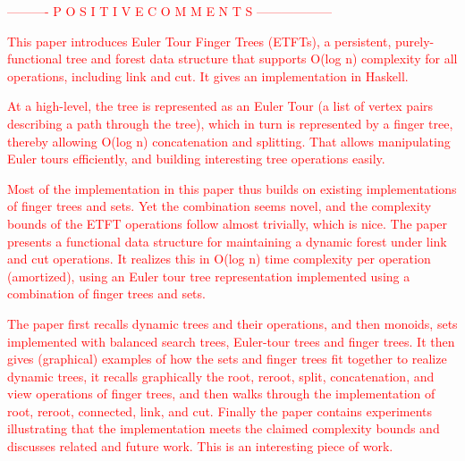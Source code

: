 \documentclass[runningheads,a4paper]{llncs}
\newcommand{\tcr} [1]{\textcolor{red}{#1}}
\begin{document}



\tcr{---------- P O S I T I V E    C O M M E N T S ------------------}


\tcr{This paper introduces Euler Tour Finger Trees (ETFTs), a persistent, purely-functional tree and forest data structure that supports O(log n) complexity for all operations, including link and cut. It gives an implementation in Haskell.}

\tcr{At a high-level, the tree is represented as an Euler Tour (a list of vertex pairs describing a path through the tree), which in turn is represented by a finger tree, thereby allowing O(log n) concatenation and splitting. That allows manipulating Euler tours efficiently, and building interesting tree operations easily.}

\tcr{Most of the implementation in this paper thus builds on existing implementations of finger trees and sets. Yet the combination seems novel, and the complexity bounds of the ETFT operations follow almost trivially, which is nice.
The paper presents a functional data structure for maintaining a dynamic forest under link and cut operations. It realizes this in O(log n) time complexity per operation (amortized), using an Euler tour tree representation implemented using a combination of finger trees and sets. }

\tcr{The paper first recalls dynamic trees and their operations, and then monoids, sets implemented with balanced search trees, Euler-tour trees and finger trees. It then gives (graphical) examples of how the sets and finger trees fit together to realize dynamic trees, it recalls graphically the root, reroot, split, concatenation, and view operations of finger trees, and then walks through the implementation of root, reroot, connected, link, and cut.
Finally the paper contains experiments illustrating that the implementation meets the claimed complexity bounds and discusses related and future work.
This is an interesting piece of work.}






 

 

 

 




%
\end{document}
